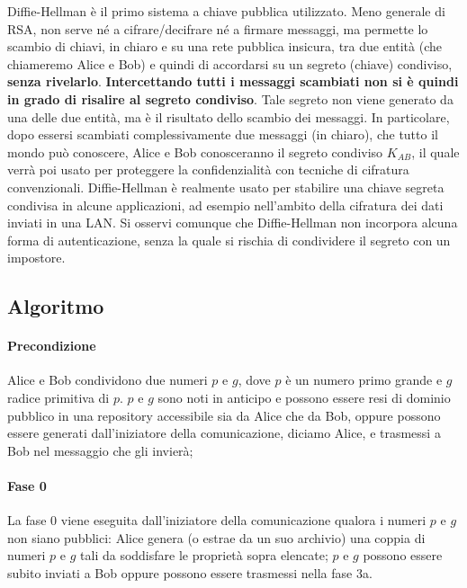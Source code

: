 Diffie-Hellman è il primo sistema a chiave pubblica utilizzato. Meno generale di RSA, non serve né a cifrare/decifrare né a firmare messaggi, ma permette lo scambio di chiavi, in chiaro e su una rete pubblica insicura, tra due entità (che chiameremo Alice e Bob) e quindi di accordarsi su un segreto (chiave) condiviso, \textbf{senza rivelarlo}. \textbf{Intercettando tutti i messaggi scambiati non si è quindi in grado di risalire al segreto condiviso}. Tale segreto non viene generato da una delle due entità, ma è il risultato dello scambio dei messaggi. In particolare, dopo essersi scambiati complessivamente due messaggi (in chiaro), che tutto il mondo può conoscere, Alice e Bob conosceranno il segreto condiviso $K_{AB}$, il quale verrà poi usato per proteggere la confidenzialità con tecniche di cifratura convenzionali.
\newline \newline
Diffie-Hellman è realmente usato per stabilire una chiave segreta condivisa in alcune applicazioni, ad esempio nell'ambito della cifratura dei dati inviati in una LAN. Si osservi comunque che Diffie-Hellman non incorpora alcuna forma di autenticazione, senza la quale si rischia di condividere il segreto con un impostore.  

\subsection{Algoritmo} 
\paragraph{Precondizione}
Alice e Bob condividono due numeri $p$ e $g$, dove $p$ è un numero primo grande e $g$ radice primitiva di $p$. $p$ e $g$ sono noti in anticipo e possono essere resi di dominio pubblico in una repository accessibile sia da Alice che da Bob, oppure possono essere generati dall'iniziatore della comunicazione, diciamo Alice, e trasmessi a Bob nel messaggio che gli invierà;
\paragraph{Fase 0}
La fase 0 viene eseguita dall'iniziatore della comunicazione qualora i numeri $p$ e $g$ non siano pubblici: Alice genera (o estrae da un suo archivio) una coppia di numeri $p$ e $g$ tali da soddisfare le proprietà sopra elencate; $p$ e $g$ possono essere subito inviati a Bob oppure possono essere trasmessi nella fase 3a.
